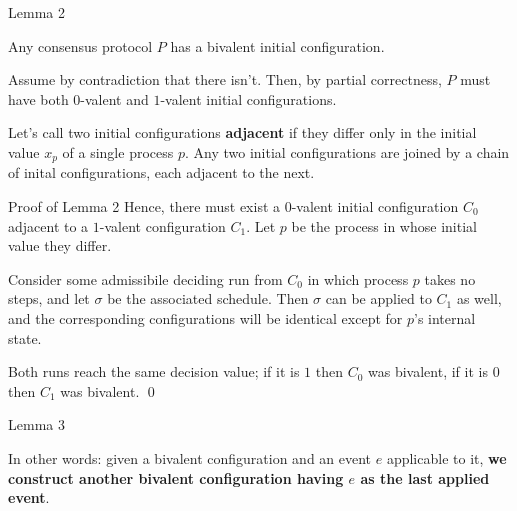 \documentclass[12pt]{beamer}
\begin{document}
  \begin{frame}{Lemma 2}
    \begin{lemma}
      Any consensus protocol \(P\) has a bivalent initial configuration.
    \end{lemma}

    \pause\vspace{0.25cm}

    Assume by contradiction that there isn't. Then, by partial correctness,
    \(P\) must have both \(0\)-valent and \(1\)-valent initial configurations.

    \pause\vspace{0.25cm}

    Let's call two initial configurations \textbf{adjacent} if they differ only
    in the initial value \(x_p\) of a single process \(p\). Any two initial
    configurations are joined by a chain of inital configurations, each
    adjacent to the next.
  \end{frame}

  \begin{frame}{Proof of Lemma 2}
    Hence, there must exist a \(0\)-valent initial configuration \(C_0\)
    adjacent to a \(1\)-valent configuration \(C_1\). Let \(p\) be the process
    in whose initial value they differ.

    \pause\vspace{0.25cm}

    Consider some admissibile deciding run from \(C_0\) in which process \(p\)
    takes no steps, and let \(\sigma\) be the associated schedule. Then
    \(\sigma\) can be applied to \(C_1\) as well, and the corresponding
    configurations will be identical except for \(p\)'s internal state.

    \pause\vspace{0.25cm}

    Both runs reach the same decision value; if it is \(1\) then \(C_0\) was
    bivalent, if it is \(0\) then \(C_1\) was bivalent. \qed
  \end{frame}

  \begin{frame}{Lemma 3}

    \vspace{0.25cm}

    In other words: given a bivalent configuration and an event \(e\)
    applicable to it, \textbf{we construct another bivalent configuration
    having \(e\) as the last applied event}.
  \end{frame}
\end{document}
